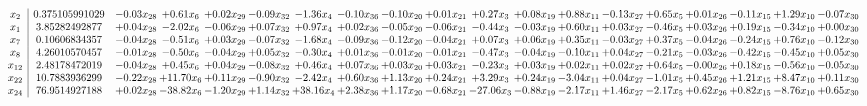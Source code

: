 \documentclass[9pt]{article}
\begin{document}
 \[\begin{array}{c| c c@{\hskip 2pt} c@{\hskip 2pt} c@{\hskip 2pt} c@{\hskip 2pt} c@{\hskip 2pt} c@{\hskip 2pt} c@{\hskip 2pt} c@{\hskip 2pt} c@{\hskip 2pt} c@{\hskip 2pt} c@{\hskip 2pt} c@{\hskip 2pt} c@{\hskip 2pt} c@{\hskip 2pt} c@{\hskip 2pt} c@{\hskip 2pt} c@{\hskip 2pt} }
 x_{2}   &  0.375105991029 & -0.03 x_{28} & +  0.61 x_{6} & +  0.02 x_{29} & -0.09 x_{32} & -1.36 x_{4} & -0.10 x_{36} & -0.10 x_{20} & +  0.01 x_{21} & +  0.27 x_{3} & +  0.08 x_{19} & +  0.88 x_{11} & -0.13 x_{27} & +  0.65 x_{5} & +  0.01 x_{26} & -0.11 x_{15} & +  1.29 x_{10} & -0.07 x_{30}\\
 x_{1}   &  3.85282492877 & +  0.04 x_{28} & -2.02 x_{6} & -0.06 x_{29} & +  0.07 x_{32} & +  0.97 x_{4} & +  0.02 x_{36} & -0.05 x_{20} & -0.06 x_{21} & -0.44 x_{3} & -0.03 x_{19} & +  0.60 x_{11} & +  0.03 x_{27} & -0.46 x_{5} & +  0.03 x_{26} & +  0.19 x_{15} & -0.34 x_{10} & +  0.00 x_{30}\\
 x_{7}   &  0.10606834357 & -0.04 x_{28} & -0.51 x_{6} & +  0.03 x_{29} & -0.07 x_{32} & -1.68 x_{4} & -0.09 x_{36} & -0.12 x_{20} & -0.04 x_{21} & +  0.07 x_{3} & +  0.06 x_{19} & +  0.35 x_{11} & -0.03 x_{27} & +  0.37 x_{5} & -0.04 x_{26} & -0.24 x_{15} & +  0.76 x_{10} & -0.12 x_{30}\\
 x_{8}   &  4.26010570457 & -0.01 x_{28} & -0.50 x_{6} & -0.04 x_{29} & +  0.05 x_{32} & -0.30 x_{4} & +  0.01 x_{36} & -0.01 x_{20} & -0.01 x_{21} & -0.47 x_{3} & -0.04 x_{19} & -0.10 x_{11} & +  0.04 x_{27} & -0.21 x_{5} & -0.03 x_{26} & -0.42 x_{15} & -0.45 x_{10} & +  0.05 x_{30}\\
 x_{12}   &  2.48178472019 & -0.04 x_{28} & +  0.45 x_{6} & +  0.04 x_{29} & -0.08 x_{32} & +  0.46 x_{4} & +  0.07 x_{36} & +  0.03 x_{20} & +  0.03 x_{21} & -0.23 x_{3} & +  0.03 x_{19} & +  0.02 x_{11} & +  0.02 x_{27} & +  0.64 x_{5} & -0.00 x_{26} & +  0.18 x_{15} & -0.56 x_{10} & -0.05 x_{30}\\
 x_{22}   &  10.7883936299 & -0.22 x_{28} & + 11.70 x_{6} & +  0.11 x_{29} & -0.90 x_{32} & -2.42 x_{4} & +  0.60 x_{36} & +  1.13 x_{20} & +  0.24 x_{21} & +  3.29 x_{3} & +  0.24 x_{19} & -3.04 x_{11} & +  0.04 x_{27} & -1.01 x_{5} & +  0.45 x_{26} & +  1.21 x_{15} & +  8.47 x_{10} & +  0.11 x_{30}\\
 x_{24}   &  76.9514927188 & +  0.02 x_{28} & -38.82 x_{6} & -1.20 x_{29} & +  1.14 x_{32} & + 38.16 x_{4} & +  2.38 x_{36} & +  1.17 x_{20} & -0.68 x_{21} & -27.06 x_{3} & -0.88 x_{19} & -2.17 x_{11} & +  1.46 x_{27} & -2.17 x_{5} & +  0.62 x_{26} & +  0.82 x_{15} & -8.76 x_{10} & +  0.65 x_{30}\\

\end{array}\]
\end{document}
